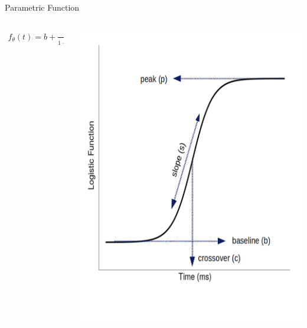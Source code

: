 \documentclass{beamer}
\begin{document}
\begin{frame}{Parametric Function}

\vspace{-5mm}

\begin{columns}
\begin{column}{0.45\textwidth}

\begin{align*}
f_{\theta}(t) = b + \frac{p-b}{1 + \exp \left( \frac{4s}{p-b} (c - t) \right)}
\end{align*}
\end{column}
\begin{column}{0.5\textwidth}  %
\begin{center}
\includegraphics[scale=0.3]{img/logistic_label.png}
\end{center}
\end{column}
\end{columns}
\end{frame}
\end{document}
